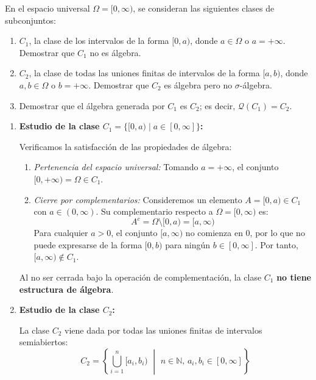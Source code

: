 \newpage
\begin{problema}
En el espacio universal $\Omega = [0,\infty)$, se consideran las siguientes clases de subconjuntos:
\begin{enumerate}[label=\alph*)]
    \item $C_1$, la clase de los intervalos de la forma $[0,a)$, donde $a \in \Omega$ o $a = +\infty$. Demostrar que $C_1$ no es álgebra.
    \item $C_2$, la clase de todas las uniones finitas de intervalos de la forma $[a,b)$, donde $a,b \in \Omega$ o $b = +\infty$. Demostrar que $C_2$ es álgebra pero no $\sigma$-álgebra.
    \item Demostrar que el álgebra generada por $C_1$ es $C_2$; es decir, $\mathcal{Q}(C_1) = C_2$.
\end{enumerate}

\tcblower

\begin{enumerate}[label=\alph*)]
    \item \textbf{Estudio de la clase $C_1 = \{ [0,a) \mid a \in [0,\infty] \}$:}
    
    Verificamos la satisfacción de las propiedades de álgebra:
    \begin{enumerate}[label=\arabic*.]
        \item \textit{Pertenencia del espacio universal:} Tomando $a = +\infty$, el conjunto $[0,+\infty) = \Omega \in C_1$.
        \item \textit{Cierre por complementarios:} Consideremos un elemento $A = [0,a) \in C_1$ con $a \in (0,\infty)$. Su complementario respecto a $\Omega = [0,\infty)$ es:
        \[
            A^c = \Omega \setminus [0,a) = [a,\infty)
        \]
        Para cualquier $a > 0$, el conjunto $[a,\infty)$ no comienza en $0$, por lo que no puede expresarse de la forma $[0,b)$ para ningún $b \in [0,\infty]$. Por tanto, $[a,\infty) \notin C_1$.
    \end{enumerate}
    Al no ser cerrada bajo la operación de complementación, la clase $C_1$ \textbf{no tiene estructura de álgebra}.

    \item \textbf{Estudio de la clase $C_2$:}
    
    La clase $C_2$ viene dada por todas las uniones finitas de intervalos semiabiertos:
    \[
        C_2 = \left\{ \bigcup_{i=1}^n [a_i, b_i) \,\,\middle|\,\, n \in \mathbb{N}, \, a_i, b_i \in [0,\infty] \right\}
    \]
    

\end{enumerate}
\end{problema}
